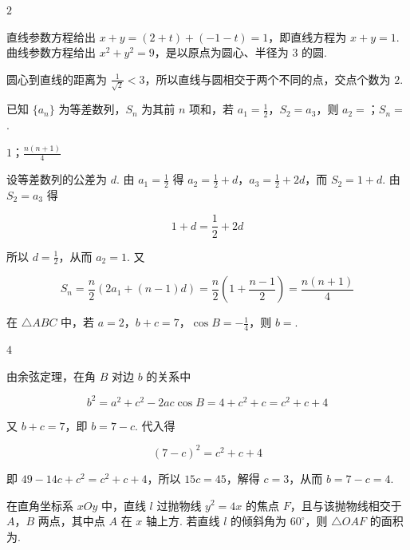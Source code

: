 \begin{answer}
\(2\)
\end{answer}

\begin{solution}
直线参数方程给出 \(x+y=(2+t)+(-1-t)=1\)，即直线方程为 \(x+y=1\). 曲线参数方程给出 \(x^2+y^2=9\)，是以原点为圆心、半径为 \(3\) 的圆.

圆心到直线的距离为 \(\frac{1}{\sqrt2}<3\)，所以直线与圆相交于两个不同的点，交点个数为 \(2\).
\end{solution}

\begin{problem}
已知 \(\{a_n\}\) 为等差数列，\(S_n\) 为其前 \(n\) 项和，若 \(a_1=\frac{1}{2}\)，\(S_2=a_3\)，则 \(a_2=\)\fillinblank{}；\(S_n=\)\fillinblank{}.
\end{problem}

\begin{answer}
\(1\)；\(\frac{n(n+1)}{4}\)
\end{answer}

\begin{solution}
设等差数列的公差为 \(d\). 由 \(a_1=\frac12\) 得 \(a_2=\frac12+d\)，\(a_3=\frac12+2d\)，而 \(S_2=1+d\). 由 \(S_2=a_3\) 得

\[
1+d=\frac12+2d
\]

所以 \(d=\frac12\)，从而 \(a_2=1\). 又

\[
S_n=\frac n2\left(2a_1+(n-1)d\right)=\frac n2\left(1+\frac{n-1}{2}\right)=\frac{n(n+1)}4
\]
\end{solution}

\begin{problem}
在 \(\triangle ABC\) 中，若 \(a=2\)，\(b+c=7\)，\(\cos B=-\frac{1}{4}\)，则 \(b=\)\fillinblank{}.
\end{problem}

\begin{answer}
\(4\)
\end{answer}

\begin{solution}
由余弦定理，在角 \(B\) 对边 \(b\) 的关系中

\[
b^2=a^2+c^2-2ac\cos B=4+c^2+c=c^2+c+4
\]

又 \(b+c=7\)，即 \(b=7-c\). 代入得

\[
(7-c)^2=c^2+c+4
\]

即 \(49-14c+c^2=c^2+c+4\)，所以 \(15c=45\)，解得 \(c=3\)，从而 \(b=7-c=4\).
\end{solution}

\begin{problem}
在直角坐标系 \(xOy\) 中，直线 \(l\) 过抛物线 \(y^2 = 4x\) 的焦点 \(F\)，且与该抛物线相交于 \(A\)，\(B\) 两点，其中点 \(A\) 在 \(x\) 轴上方. 若直线 \(l\) 的倾斜角为 \(60^\circ\)，则 \(\triangle OAF\) 的面积为\fillinblank{}.
\end{problem}

